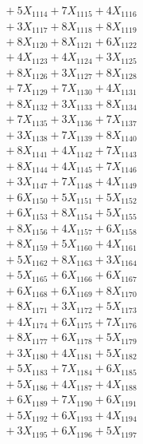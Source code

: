 \documentclass[a4paper,10pt]{article}
\begin{document}
{\begin{align}
&\;  + 5 X_{1114} + 7 X_{1115} + 4 X_{1116} \\[0.3ex]
&\;  + 3 X_{1117} + 8 X_{1118} + 8 X_{1119} \\[0.5ex]\allowbreak
&\;  + 8 X_{1120} + 8 X_{1121} + 6 X_{1122} \\[0.3ex]
&\;  + 4 X_{1123} + 4 X_{1124} + 3 X_{1125} \\[0.3ex]
&\;  + 8 X_{1126} + 3 X_{1127} + 8 X_{1128} \\[0.3ex]
&\;  + 7 X_{1129} + 7 X_{1130} + 4 X_{1131} \\[0.3ex]
&\;  + 8 X_{1132} + 3 X_{1133} + 8 X_{1134} \\[0.3ex]
&\;  + 7 X_{1135} + 3 X_{1136} + 7 X_{1137} \\[0.3ex]
&\;  + 3 X_{1138} + 7 X_{1139} + 8 X_{1140} \\[0.3ex]
&\;  + 8 X_{1141} + 4 X_{1142} + 7 X_{1143} \\[0.3ex]
&\;  + 8 X_{1144} + 4 X_{1145} + 7 X_{1146} \\[0.3ex]
&\;  + 3 X_{1147} + 7 X_{1148} + 4 X_{1149} \\[0.5ex]\allowbreak
&\;  + 6 X_{1150} + 5 X_{1151} + 5 X_{1152} \\[0.3ex]
&\;  + 6 X_{1153} + 8 X_{1154} + 5 X_{1155} \\[0.3ex]
&\;  + 8 X_{1156} + 4 X_{1157} + 6 X_{1158} \\[0.3ex]
&\;  + 8 X_{1159} + 5 X_{1160} + 4 X_{1161} \\[0.3ex]
&\;  + 5 X_{1162} + 8 X_{1163} + 3 X_{1164} \\[0.3ex]
&\;  + 5 X_{1165} + 6 X_{1166} + 6 X_{1167} \\[0.3ex]
&\;  + 6 X_{1168} + 6 X_{1169} + 8 X_{1170} \\[0.3ex]
&\;  + 8 X_{1171} + 3 X_{1172} + 5 X_{1173} \\[0.3ex]
&\;  + 4 X_{1174} + 6 X_{1175} + 7 X_{1176} \\[0.3ex]
&\;  + 8 X_{1177} + 6 X_{1178} + 5 X_{1179} \\[0.5ex]\allowbreak
&\;  + 3 X_{1180} + 4 X_{1181} + 5 X_{1182} \\[0.3ex]
&\;  + 5 X_{1183} + 7 X_{1184} + 6 X_{1185} \\[0.3ex]
&\;  + 5 X_{1186} + 4 X_{1187} + 4 X_{1188} \\[0.3ex]
&\;  + 6 X_{1189} + 7 X_{1190} + 6 X_{1191} \\[0.3ex]
&\;  + 5 X_{1192} + 6 X_{1193} + 4 X_{1194} \\[0.3ex]
&\;  + 3 X_{1195} + 6 X_{1196} + 5 X_{1197} \\[0.3ex]

\end{align}}
\end{document}
